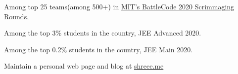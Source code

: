 \vspace{2mm}
\begin{cventries}
{\fontsize{10pt}{1em}\bodyfontlight\upshape\color{text}
\begin{cvitems}
  \item Among top 25 teams(among 500+) in \href{https://github.com/abhishekshree/BattleCode}{\color{teal}MIT's BattleCode 2020 Scrimmaging Rounds.}
  \item Among the top 3\% students in the country, JEE Advanced 2020.
  \item Among the top 0.2\% students in the country, JEE Main 2020.
  \item Maintain a personal web page and blog at \href{http://shreee.me/}{\color{teal}shreee.me}
\end{cvitems}
}
\end{cventries}
